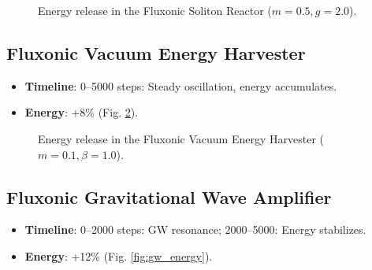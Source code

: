 \documentclass[11pt]{article}
\begin{document}
\begin{figure}[h]
    \centering
    \caption{Energy release in the Fluxonic Soliton Reactor (\(m=0.5, g=2.0\)).}
    \label{fig:reactor_energy}
\end{figure}

\subsection{Fluxonic Vacuum Energy Harvester}
\begin{itemize}
    \item \textbf{Timeline}: 0--5000 steps: Steady oscillation, energy accumulates.
    \item \textbf{Energy}: +8\% (Fig. \ref{fig:vacuum_energy}).
\end{itemize}

\begin{figure}[h]
    \centering
    \caption{Energy release in the Fluxonic Vacuum Energy Harvester (\(m=0.1, \beta=1.0\)).}
    \label{fig:vacuum_energy}
\end{figure}

\subsection{Fluxonic Gravitational Wave Amplifier}
\begin{itemize}
    \item \textbf{Timeline}: 0--2000 steps: GW resonance; 2000--5000: Energy stabilizes.
    \item \textbf{Energy}: +12\% (Fig. \ref{fig:gw_energy}).
\end{itemize}
\end{document}

